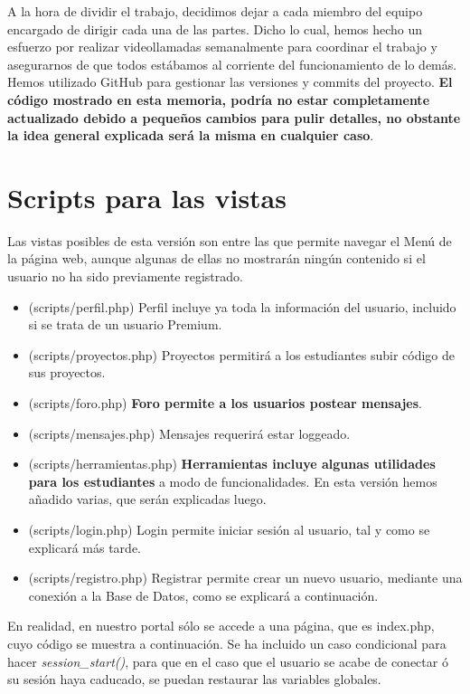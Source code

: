 \documentclass[12pt]{report}
\begin{document}
A la hora de dividir el trabajo, decidimos dejar a cada miembro del equipo encargado de dirigir cada una de las partes. Dicho lo cual, hemos hecho un esfuerzo por realizar videollamadas semanalmente para coordinar el trabajo y asegurarnos de que todos estábamos al corriente del funcionamiento de lo demás. Hemos utilizado GitHub para gestionar las versiones y commits del proyecto. \textbf{El código mostrado en esta memoria, podría no estar completamente actualizado debido a pequeños cambios para pulir detalles, no obstante la idea general explicada será la misma en cualquier caso}.
\newpage
\section{Scripts para las vistas}
Las vistas posibles de esta versión son entre las que permite navegar el Menú de la página web, aunque algunas de ellas no mostrarán ningún contenido si el usuario no ha sido previamente registrado.
\begin{itemize}
    \item (scripts/perfil.php) Perfil incluye ya toda la información del usuario, incluido si se trata de un usuario Premium.
    \item (scripts/proyectos.php) Proyectos permitirá a los estudiantes subir código de sus proyectos.
    \item (scripts/foro.php) \textbf{Foro permite a los usuarios postear mensajes}.
    \item (scripts/mensajes.php) Mensajes requerirá estar loggeado.
    \item (scripts/herramientas.php) \textbf{Herramientas incluye algunas utilidades para los estudiantes} a modo de funcionalidades. En esta versión hemos añadido varias, que serán explicadas luego.
    \item (scripts/login.php) Login permite iniciar sesión al usuario, tal y como se explicará más tarde. 
    \item (scripts/registro.php) Registrar permite crear un nuevo usuario, mediante una conexión a la Base de Datos, como se explicará a continuación.
\end{itemize}

En realidad, en nuestro portal sólo se accede a una página, que es index.php, cuyo código se muestra a continuación. Se ha incluido un caso condicional para hacer \textit{session\_start()}, para que en el caso que el usuario se acabe de conectar ó su sesión haya caducado, se puedan restaurar las variables globales.
\end{document}
